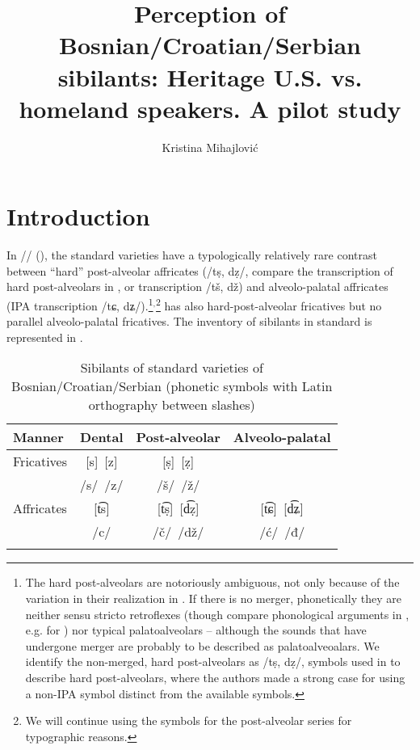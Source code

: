 \documentclass[output=paper,modfonts,newtxmath,hidelinks,]{langscibook}
\author{Kristina Mihajlović\affiliation{University of Arizona}\lastand{Małgorzata Ćavar\affiliation{Indiana University}}}
\title{Perception of Bosnian/Croatian/Serbian sibilants: Heritage U.S. vs. homeland speakers. A pilot study}
\begin{document}
\maketitle 
{}

 

\section{Introduction}

In // (), the standard varieties have a typologically relatively rare contrast between “hard” post-alveolar affricates (/tṣ, dẓ/, compare the transcription of   hard post-alveolars in \citet{Ladefoged-Disner2012}, or  transcription /tš, dž) and alveolo-palatal affricates (IPA transcription /tɕ, dʑ/).\footnote{The hard post-alveolars are notoriously ambiguous, not only because of the variation in their realization in . If there is no merger, phonetically they are neither sensu stricto retroflexes (though compare phonological arguments in \citealt{Hamann2003}, e.g. for ) nor typical palatoalveolars – although the sounds that have undergone merger are probably to be described as palatoalveoalars. We identify the non-merged, hard post-alveolars as /tṣ, dẓ/, symbols used in \citet[169]{Ladefoged-Disner2012} to describe  hard post-alveolars, where the authors made a strong case for using a non-IPA symbol distinct from the available symbols.}$^,$\footnote{We will continue using the  symbols for the post-alveolar series for typographic reasons.}  has also hard-post-alveolar fricatives but no parallel alveolo-palatal fricatives. The inventory of sibilants in standard  is represented in .


\begin{table}
\begin{tabularx}{\textwidth}{XCCC} 
\lsptoprule 
 Manner &   {     Dental} & { Post-alveolar} & {     Alveolo-palatal}\\
\midrule 
Fricatives & [s]~[z]& [ṣ]~[ẓ] \\
           & /s/~/z/& /š/~/ž/ \\
\tablevspace           
Affricates & [t͡s]   & [t͡ṣ]~[d͡ẓ] & [t͡ɕ]~[d͡ʑ]\\
           & /c/    & /č/~/dž/  & /ć/~/đ/\\
\lspbottomrule
\end{tabularx}
\caption{\label{tab:mihajlovic:1} Sibilants of standard varieties of Bosnian/Croatian/Serbian (phonetic symbols with Latin orthography between slashes)}
\end{table}
\end{document}
